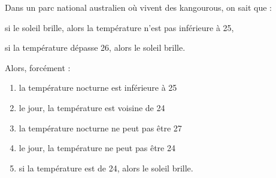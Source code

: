 Dans un parc national australien où vivent des kangourous, on sait que :
\begin{myenumerate}
  \item si le soleil brille, alors la température n'est pas inférieure à 25\degres,
  \item si la température dépasse 26\degres, alors le soleil brille.
\end{myenumerate}
Alors, forcément :
  \begin{enumerate}[A/]
  \item la température nocturne est inférieure à 25\degres
  \item le jour, la température est voisine de 24\degres
  \item la température nocturne ne peut pas être 27\degres
  \item le jour, la température ne peut pas être 24\degres
  \item si la température est de 24\degres, alors le soleil brille.
  \end{enumerate}